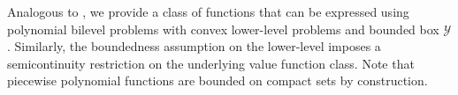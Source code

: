 \documentclass{article}
\newcommand*{\cY}{\mathcal{Y}}
\newcommand*{\RR}{\mathbb{R}}
\newcommand{\argmin}{\arg\min}
\theoremstyle{plain}
\theoremstyle{definition}
\begin{document}

        

Analogous to , we provide a class of functions that can be expressed using polynomial bilevel problems with convex lower-level problems and bounded box $\cY$. Similarly, the boundedness assumption on the lower-level imposes a semicontinuity restriction on the underlying value function class. Note that piecewise polynomial functions are bounded on compact sets by construction.
\end{document}
